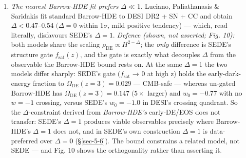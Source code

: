 \documentclass[preprint,12pt]{elsarticle}
\begin{document}
\begin{enumerate}
  corrected. \emph{Defence (partial):} the bias is DESY5-specific (``in
  contrast to the uniform behaviour of PantheonPlus''), and SEDE's
  headline uses Pantheon+; more decisively, SEDE's leave-one-probe-out
  drops supernovae entirely and stays preferred
  \((\Delta \chi ^{2} \approx  -4.85)\), and
  \(F_\mathrm{AP} / tracer\)-LOO are SN-free. SEDE is not SN-driven ---
  but if the field's evolving-DE evidence softens, SEDE's \emph{context}
  erodes, and its ``moderate, not established'' framing must hold.
\item
  \emph{The nearest Barrow-HDE fit prefers \(\Delta  \ll  1\).} Luciano,
  Paliathanasis \& Saridakis \citep{Luciano:2025elo} fit standard
  Barrow-HDE to DESI DR2 + SN + CC and obtain \(\Delta  < 0.47\)--0.54
  \((\Delta  = 0\) within \(1\sigma\), mild positive tendency) ---
  which, read literally, disfavours SEDE's \(\Delta  = 1\).
  \emph{Defence (shown, not asserted; Fig. 10):} both models share the
  scaling \(\rho _\mathrm{DE} \propto  H^{2-\Delta }\); the \emph{only}
  difference is SEDE's structure gate \(f_{\mathrm{sat}}(z)\), and the
  gate is exactly what decouples \(\Delta\) from the observable the
  Barrow-HDE bound rests on. At the same \(\Delta  = 1\) the two models
  differ sharply: SEDE's gate \((f_{\mathrm{sat}}\) → 0 at high z) holds
  the early-dark-energy fraction to \(\Omega _\mathrm{DE}(z=3) = 0.029\)
  --- CMB-safe --- whereas un-gated Barrow-HDE has
  \(\Omega _\mathrm{DE}(z=3) = 0.147\) \((5\times\) larger) and
  \(w_{0} = -0.77\) with no \(w = -1\) crossing, versus SEDE's
  \(w_{0} = -1.0\) in DESI's crossing quadrant. So the
  \(\Delta\)-constraint derived from \emph{Barrow-HDE's} early-DE/EOS
  does not transfer: SEDE's \(\Delta  = 1\) produces viable observables
  precisely where Barrow-HDE's \(\Delta  = 1\) does not, and in SEDE's
  own construction \(\Delta  = 1\) is data-preferred over
  \(\Delta  = 0\) (§\ref{sec-5-6}). The bound constrains a related
  model, not SEDE --- and Fig. 10 shows the orthogonality rather than
  asserting it.
\end{enumerate}
\end{document}
